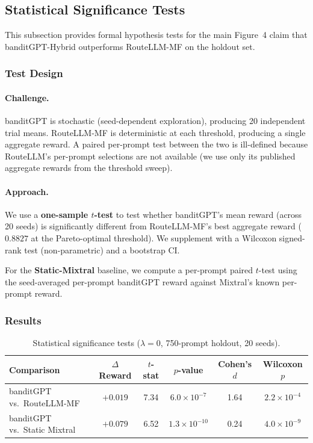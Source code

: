 
\subsection{Statistical Significance Tests}
\label{appendix:statistical_tests}

This subsection provides formal hypothesis tests for the main Figure~4 claim
that banditGPT-Hybrid outperforms RouteLLM-MF on the holdout set.

\subsubsection{Test Design}

\paragraph{Challenge.}
banditGPT is stochastic (seed-dependent exploration), producing 20
independent trial means.  RouteLLM-MF is deterministic at each threshold,
producing a single aggregate reward.  A paired per-prompt test between the
two is ill-defined because RouteLLM's per-prompt selections are not available
(we use only its published aggregate rewards from the threshold sweep).

\paragraph{Approach.}
We use a \textbf{one-sample $t$-test} to test whether banditGPT's mean reward
(across 20 seeds) is significantly different from RouteLLM-MF's best
aggregate reward ($0.8827$ at the Pareto-optimal threshold).  We supplement
with a Wilcoxon signed-rank test (non-parametric) and a bootstrap CI.

For the \textbf{Static-Mixtral} baseline, we compute a per-prompt paired
$t$-test using the seed-averaged per-prompt banditGPT reward against
Mixtral's known per-prompt reward.

\subsubsection{Results}

\begin{table}[h]
\centering
\caption{Statistical significance tests ($\lambda{=}0$, 750-prompt holdout, 20 seeds).}
\label{tab:significance}
\small
\begin{tabular}{@{}lccccc@{}}
\toprule
\textbf{Comparison} & \textbf{$\Delta$ Reward} & \textbf{$t$-stat} & \textbf{$p$-value} & \textbf{Cohen's $d$} & \textbf{Wilcoxon $p$} \\
\midrule
banditGPT vs.\ RouteLLM-MF & $+0.019$ & 7.34 & $6.0 \times 10^{-7}$ & 1.64 & $2.2 \times 10^{-4}$ \\
banditGPT vs.\ Static Mixtral & $+0.079$ & 6.52 & $1.3 \times 10^{-10}$ & 0.24 & $4.0 \times 10^{-9}$ \\
\bottomrule
\end{tabular}
\end{table}

